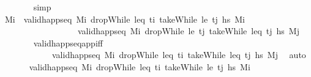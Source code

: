 \begin{isabellebody}
\ \ \ \ \ \ \isamarkupfalse%
\ simp\isanewline
\ \ \ \ \isamarkupfalse%
\ \isamarkupfalse%
\ M\isactrlsub i{\isacharprime}{\kern0pt}\ \ {\isachardoublequoteopen}valid{\isacharunderscore}{\kern0pt}happ{\isacharunderscore}{\kern0pt}seq\ M\isactrlsub i\ {\isacharparenleft}{\kern0pt}dropWhile\ {\isacharparenleft}{\kern0pt}leq\ t\isactrlsub i{\isacharparenright}{\kern0pt}\ {\isacharparenleft}{\kern0pt}takeWhile\ {\isacharparenleft}{\kern0pt}le\ t\isactrlsub j{\isacharparenright}{\kern0pt}\ hs\ M\isactrlsub i{\isacharprime}{\kern0pt}{\isachardoublequoteclose}\ \isanewline
\ \ \ \ \ \ \ \ \ \ \ \ \ \ \ \ \ \ {\isachardoublequoteopen}valid{\isacharunderscore}{\kern0pt}happ{\isacharunderscore}{\kern0pt}seq\ M\isactrlsub i{\isacharprime}{\kern0pt}\ {\isacharparenleft}{\kern0pt}dropWhile\ {\isacharparenleft}{\kern0pt}le\ t\isactrlsub j{\isacharparenright}{\kern0pt}\ {\isacharparenleft}{\kern0pt}takeWhile\ {\isacharparenleft}{\kern0pt}leq\ t\isactrlsub j{\isacharparenright}{\kern0pt}\ hs\ M\isactrlsub j{\isachardoublequoteclose}\isanewline
\ \ \ \ \ \ \isamarkupfalse%
\ valid{\isacharunderscore}{\kern0pt}happ{\isacharunderscore}{\kern0pt}seq{\isacharunderscore}{\kern0pt}app{\isacharunderscore}{\kern0pt}iff\isanewline
\ \ \ \ \ \ \ \ \ \ \ \ {\isacartoucheopen}valid{\isacharunderscore}{\kern0pt}happ{\isacharunderscore}{\kern0pt}seq\ M\isactrlsub i\ {\isacharparenleft}{\kern0pt}dropWhile\ {\isacharparenleft}{\kern0pt}leq\ t\isactrlsub i{\isacharparenright}{\kern0pt}\ {\isacharparenleft}{\kern0pt}takeWhile\ {\isacharparenleft}{\kern0pt}leq\ t\isactrlsub j{\isacharparenright}{\kern0pt}\ hs\ M\isactrlsub j{\isacartoucheclose}\ \isamarkupfalse%
\ auto\isanewline
\ \ \ \ \isamarkupfalse%
\ {}{\isacharcolon}{\kern0pt}\ {\isachardoublequoteopen}valid{\isacharunderscore}{\kern0pt}happ{\isacharunderscore}{\kern0pt}seq\ M\isactrlsub i\ {\isacharparenleft}{\kern0pt}dropWhile\ {\isacharparenleft}{\kern0pt}leq\ t\isactrlsub i{\isacharparenright}{\kern0pt}\ {\isacharparenleft}{\kern0pt}takeWhile\ {\isacharparenleft}{\kern0pt}le\ t\isactrlsub j{\isacharparenright}{\kern0pt}\ hs\ M\isactrlsub i{\isacharprime}{\kern0pt}{\isachardoublequoteclose}\isanewline

\end{isabellebody}
